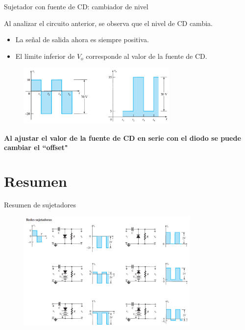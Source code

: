 \documentclass[t,aspectratio=169]{beamer}
\begin{document}
\begin{frame}{Sujetador con fuente de CD: cambiador de nivel}

Al analizar el circuito anterior, se observa que el nivel de CD cambia.

\begin{itemize}
    \item La señal de salida ahora es siempre positiva.
    \item El límite inferior de $V_o$ corresponde al valor de la fuente de CD.
\end{itemize}

\begin{figure}
    \centering
    \includegraphics[width=0.7\textwidth]{figures/cambiador_nivel_4.png}
\end{figure}

\textbf{Al ajustar el valor de la fuente de CD en serie con el diodo se puede cambiar el ``offset"}

\end{frame}


\section{Resumen}
\begin{frame}{Resumen de sujetadores}

\begin{figure}
    \centering
    \includegraphics[width=0.8\textwidth]{figures/sujetador_resumen.png}
\end{figure}

\end{frame}
\end{document}
